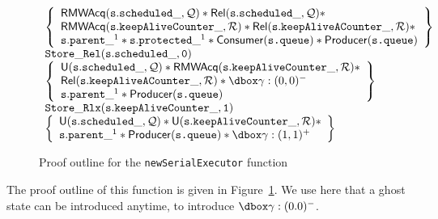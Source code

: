 \begin{figure}
\begin{equation*}
\begin{array}{l}
	\left\{
			\begin{array}{l}
				\mathsf{RMWAcq}(\mathtt{s.scheduled\_}, \mathcal{Q}) * \mathsf{Rel}(\mathtt{s.scheduled\_}, \mathcal{Q}) * \\ 
					\mathsf{RMWAcq}(\mathtt{s.keepAliveCounter\_}, \mathcal{R}) * \mathsf{Rel}(\mathtt{s.keepAliveACounter\_}, \mathcal{R}) * \\
					 \mathtt{s.parent\_}^1 * \mathtt{s.protected\_}^1 * \consQ * \prodQ
			\end{array} \right\} \\

			\mathtt{Store\_Rel(s.scheduled\_, 0)} \\

	\left\{
			\begin{array}{l}
				\mathsf{U}(\mathtt{s.scheduled\_}, \mathcal{Q}) * \mathsf{RMWAcq}(\mathtt{s.keepAliveCounter\_}, \mathcal{R}) * \\
					\mathsf{Rel}(\mathtt{s.keepAliveACounter\_}, \mathcal{R}) * \ghost{\gamma : (0, 0)^-}\\
				\mathtt{s.parent\_}^1 * \prodQ
			\end{array} \right\} \\

			\mathtt{Store\_Rlx(s.keepAliveCounter\_, 1)} \\

	\left\{
			\begin{array}{l}
				\mathsf{U}(\mathtt{s.scheduled\_}, \mathcal{Q}) * \mathsf{U}(\mathtt{s.keepAliveCounter\_}, \mathcal{R}) * \\
					\mathtt{s.parent\_}^1 * \prodQ * \ghost{\gamma : (1, 1)^+}
			\end{array} \right\} \\



\end{array}
\end{equation*}

		\caption{Proof outline for the \texttt{newSerialExecutor} function}
		\label{fig:proofNew}

\end{figure}

The proof outline of this function is given in Figure~\ref{fig:proofNew}. We use here that a ghost state can be introduced anytime, to introduce $\ghost{\gamma: (0. 0)^-}$. %



